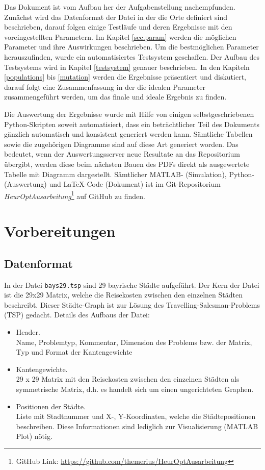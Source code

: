 \noindent Das Dokument ist vom Aufbau her der Aufgabenstellung nachempfunden.
Zunächst wird das Datenformat der Datei in der die Orte definiert sind
beschrieben, darauf folgen einige Testläufe und deren Ergebnisse mit
den voreingestellten Parametern.
Im Kapitel \ref{sec.param} werden die möglichen Parameter und ihre
Auswirkungen beschrieben.
Um die bestmöglichen Parameter herauszufinden, wurde ein automatisiertes
Testsystem geschaffen. Der Aufbau des Testsystems wird in Kapitel
\ref{testsystem} genauer beschrieben.
In den Kapiteln \ref{populations} bis \ref{mutation} werden die Ergebnisse
präsentiert und diskutiert, darauf folgt eine Zusammenfassung in der
die idealen Parameter zusammengeführt werden, um das finale und
ideale Ergebnis zu finden.

Die Auswertung der Ergebnisse wurde mit Hilfe von einigen selbstgeschriebenen
Python-Skripten soweit automatisiert, dass ein beträchtlicher Teil des
Dokuments gänzlich automatisch und konsistent generiert werden kann.
Sämtliche Tabellen sowie die zugehörigen Diagramme sind auf diese Art
generiert worden.
Das bedeutet, wenn der Auswertungsserver neue Resultate an das
Repositorium übergibt, werden diese beim nächsten Bauen des PDFs
direkt als ausgewertete Tabelle mit Diagramm dargestellt.
Sämtlicher MATLAB- (Simulation), Python- (Auswertung) und LaTeX-Code (Dokument)
ist im Git-Repositorium \emph{HeurOptAusarbeitung}\footnote{
GitHub Link: \url{https://github.com/themerius/HeurOptAusarbeitung}} auf GitHub
zu finden. 


\section{Vorbereitungen}


\subsection{Datenformat}

\noindent In der Datei {\tt bays29.tsp} sind 29 bayrische Städte aufgeführt.
Der Kern der Datei ist die 29x29 Matrix, welche die Reisekosten zwischen
den einzelnen Städten beschreibt. Dieser Städte-Graph ist zur Lösung
des Travelling-Salesman-Problems (TSP) gedacht.
Details des Aufbaus der Datei:

\begin{itemize}
  \item Header.\\
  Name, Problemtyp, Kommentar, Dimension des Problems bzw. der Matrix, Typ und Format der Kantengewichte
  \item Kantengewichte.\\
  29 x 29 Matrix mit den Reisekosten zwischen den einzelnen Städten als symmetrische Matrix, d.h. es handelt sich um einen ungerichteten Graphen.
  \item Positionen der Städte.\\
  Liste mit Stadtnummer und X-, Y-Koordinaten, welche die Städtepositionen beschreiben.
  Diese Informationen sind lediglich zur Visualisierung (MATLAB Plot) nötig.
\end{itemize}


